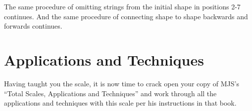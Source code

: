 \documentclass[12pt]{report}
\begin{document}
The same procedure of omitting strings from the initial shape in
positions 2-7 continues. And the same procedure of connecting shape to
shape backwards and forwards continues.

\section{Applications and Techniques}

Having taught you the scale, it is now time to crack open your copy of
MJS's ``Total Scales, Applications and Techniques'' and work through
all the applications and techniques with this scale per his
instructions in that book.
\end{document}
